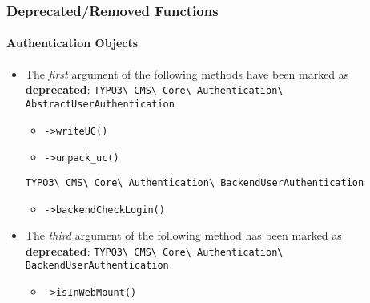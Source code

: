 %

\begin{frame}[fragile]
	\frametitle{Deprecated/Removed Functions}
	\framesubtitle{Authentication Objects}


	\begin{itemize}
		\item The \textit{first} argument of the following methods have been
			marked as \textbf{deprecated}:\newline
			\smaller\texttt{TYPO3\textbackslash
				CMS\textbackslash
				Core\textbackslash
				Authentication\textbackslash
				AbstractUserAuthentication}\normalsize
			\begin{itemize}\smaller
				\item \texttt{->writeUC()}
				\item \texttt{->unpack\_uc()}
			\end{itemize}\normalsize

			\smaller\texttt{TYPO3\textbackslash
				CMS\textbackslash
				Core\textbackslash
				Authentication\textbackslash
				BackendUserAuthentication}\normalsize
			\begin{itemize}\smaller
				\item \texttt{->backendCheckLogin()}
			\end{itemize}\normalsize

		\item The \textit{third} argument of the following method has been
			marked as \textbf{deprecated}:\newline
			\smaller\texttt{TYPO3\textbackslash
				CMS\textbackslash
				Core\textbackslash
				Authentication\textbackslash
				BackendUserAuthentication}\normalsize
			\begin{itemize}\smaller
				\item \texttt{->isInWebMount()}
			\end{itemize}\normalsize

	\end{itemize}

\end{frame}


